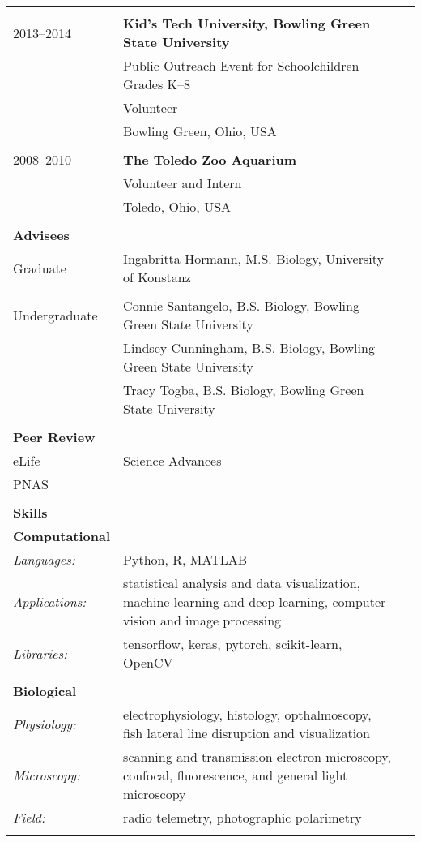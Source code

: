 \documentclass[letterpaper,10pt,oneside]{article}
\begin{document}
\begin{longtable}{@{} l p{5.3in}l}
& \\
\large{2013–2014}
& \textbf{Kid's Tech University, Bowling Green State University} \\
& Public Outreach Event for Schoolchildren Grades K–8 \\
& Volunteer \\
& Bowling Green, Ohio, USA \\
& \\
\large{2008–2010}
& \textbf{The Toledo Zoo Aquarium} \\
& Volunteer and Intern \\
& Toledo, Ohio, USA \\
& \\

 \Large{\textbf{Advisees}}  \vspace{5mm} \\
 \large{Graduate} 
 & Ingabritta Hormann, M.S. Biology, University of Konstanz \\
 & \\
 \large{Undergraduate}
 &  Connie Santangelo, B.S. Biology, Bowling Green State University \\
 & Lindsey Cunningham, B.S. Biology, Bowling Green State University \\
 & Tracy Togba, B.S. Biology, Bowling Green State University \\
& \\

 \Large{\textbf{Peer Review}}  \vspace{5mm} \\
 eLife
 &Science Advances\\
 PNAS 
 \vspace{1mm} \\
 & \\

\Large{\textbf{Skills}} \vspace{5mm} \\
\large{\textbf{Computational}} \\
\normalsize{\textit{Languages: }}
& Python, R, MATLAB \\ %
\normalsize{\textit{Applications: }}
& statistical analysis and data visualization, machine learning and deep learning, computer vision and image processing \\
\normalsize{\textit{Libraries: }}
& tensorflow, keras, pytorch, scikit-learn, OpenCV \\
& \\
\large{\textbf{Biological}} \\
\normalsize{\textit{Physiology: }}
& electrophysiology, histology, opthalmoscopy, fish lateral line disruption and visualization \\
\normalsize{\textit{Microscopy: }}
& scanning and transmission electron microscopy, confocal, fluorescence, and general light microscopy \\
\normalsize{\textit{Field: }}
& radio telemetry, photographic polarimetry \\
& \\
\end{longtable}
\end{document}
